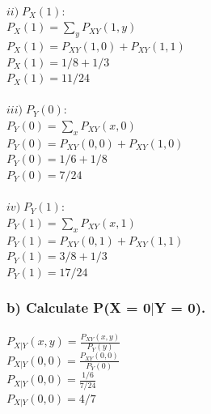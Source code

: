 \documentclass[a4paper]{article}
\begin{document}
\paragraph{$ii) \; P_X(1):                      $
\\
$ \displaystyle P_X(1) = \sum_{y} P_{XY}(1,y)   $\\
$ P_X(1) = P_{XY}(1,0) + P_{XY}(1,1)            $\\
$ P_X(1) = 1/8 + 1/3                            $\\
$ \boxed{ P_X(1) = 11/24 }                      $\\
}
\paragraph{$iii) \; P_Y(0):                     $
\\
$ \displaystyle P_Y(0) = \sum_{x} P_{XY}(x,0)   $\\
$ P_Y(0) = P_{XY}(0,0) + P_{XY}(1,0)            $\\
$ P_Y(0) = 1/6 + 1/8                            $\\
$ \boxed{ P_Y(0) = 7/24 }                       $\\
}
\paragraph{$iv) \; P_Y(1):                      $
\\
$ \displaystyle P_Y(1) = \sum_{x} P_{XY}(x,1)   $\\
$ P_Y(1) = P_{XY}(0,1) + P_{XY}(1,1)            $\\
$ P_Y(1) = 3/8 + 1/3                            $\\
$ \boxed{ P_Y(1) = 17/24 }                      $\\
}

\subsubsection{b) Calculate P(X = 0$|$Y = 0).}
\paragraph{
$ \displaystyle P_{X|Y}(x,y) = \frac{P_{XY}(x,y)}{P_Y(y)}   $\\
$ \displaystyle P_{X|Y}(0,0) = \frac{P_{XY}(0,0)}{P_Y(0)}   $\\
$ P_{X|Y}(0,0) = \frac{1/6}{7/24}                           $\\
$ \boxed{ P_{X|Y}(0,0) = 4/7 }                              $\\
}
\end{document}
